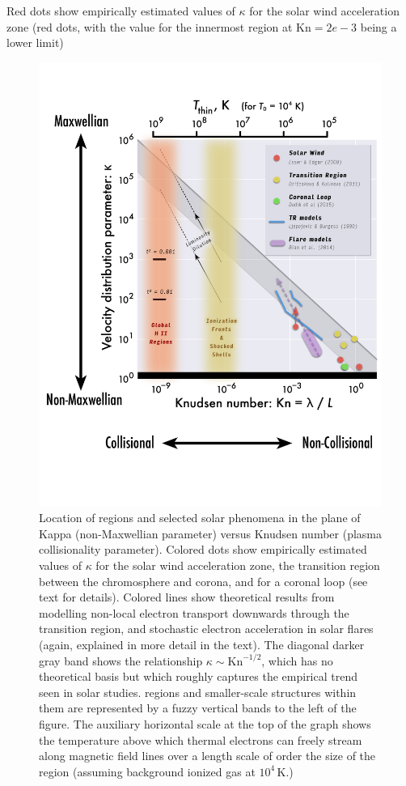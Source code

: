 \documentclass{emulateapj}
\newcommand\Kn{\ensuremath{\mathrm{Kn}}}
\newcommand\hii{\ion{H}{2}}
\begin{document}
Red dots show empirically estimated values of \(\kappa\)
for the solar wind acceleration zone \citep{Esser:2000a} (red dots,
with the value for the innermost region at \(\Kn = 2e-3\)
being a lower limit)




\begin{figure}
  \centering
  \includegraphics[width=0.8\linewidth]{kappa-versus-knudsen-graph}
  \caption{Location of \hii{} regions and selected solar phenomena in
    the plane of Kappa (non-Maxwellian parameter) versus Knudsen
    number (plasma collisionality parameter).  Colored dots show
    empirically estimated values of \(\kappa\) for the solar wind
    acceleration zone, the transition region between the chromosphere
    and corona, and for a coronal loop (see text for details).  Colored
    lines show theoretical results from modelling non-local electron transport
    downwards through the transition region, and stochastic electron
    acceleration in solar flares (again, explained in more detail in
    the text).  The diagonal darker gray band shows the relationship
    \(\kappa \sim \Kn^{-1/2}\), which has no theoretical basis but
    which roughly captures the empirical trend seen in solar
    studies. \hii{} regions and smaller-scale structures within them
    are represented by a fuzzy vertical bands to the left of the figure.
    The auxiliary horizontal scale at the top of the graph shows the
    temperature above which thermal electrons can freely stream along
    magnetic field lines over a length scale of order the size of the
    region (assuming background ionized gas at \(10^4\)\,K.)}
  \label{fig:kappa-knudsen}
\end{figure}
\end{document}
